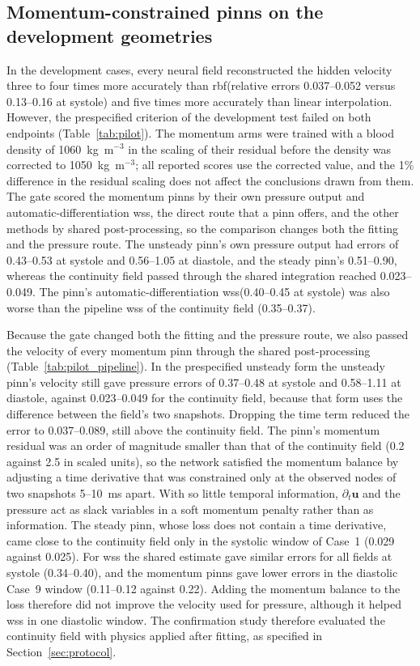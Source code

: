 \documentclass[12pt,a4paper]{article}
\newcommand{\PINN}{\ac{pinn}\xspace}
\newcommand{\PINNs}{\acp{pinn}\xspace}
\newcommand{\WSS}{\ac{wss}\xspace}
\newcommand{\RBF}{\ac{rbf}\xspace}
\theoremstyle{definition}
\numberwithin{equation}{section}
\begin{document}
\subsection{Momentum-constrained \texorpdfstring{\PINNs}{PINNs} on the development geometries}
\label{sec:pilot_results}
In the development cases, every neural field reconstructed the hidden velocity three to four times more accurately than \RBF (relative errors 0.037--0.052 versus 0.13--0.16 at systole) and five times more accurately than linear interpolation. However, the prespecified criterion of the development test failed on both endpoints (Table~\ref{tab:pilot}). The momentum arms were trained with a blood density of 1060~kg~m$^{-3}$ in the scaling of their residual before the density was corrected to 1050~kg~m$^{-3}$; all reported scores use the corrected value, and the 1\% difference in the residual scaling does not affect the conclusions drawn from them. The gate scored the momentum \PINNs by their own pressure output and automatic-differentiation \WSS, the direct route that a \PINN offers, and the other methods by shared post-processing, so the comparison changes both the fitting and the pressure route. The unsteady \PINN's own pressure output had errors of 0.43--0.53 at systole and 0.56--1.05 at diastole, and the steady \PINN's 0.51--0.90, whereas the continuity field passed through the shared integration reached 0.023--0.049. The \PINN's automatic-differentiation \WSS (0.40--0.45 at systole) was also worse than the pipeline \WSS of the continuity field (0.35--0.37).

Because the gate changed both the fitting and the pressure route, we also passed the velocity of every momentum \PINN through the shared post-processing (Table~\ref{tab:pilot_pipeline}). In the prespecified unsteady form the unsteady \PINN's velocity still gave pressure errors of 0.37--0.48 at systole and 0.58--1.11 at diastole, against 0.023--0.049 for the continuity field, because that form uses the difference between the field's two snapshots. Dropping the time term reduced the error to 0.037--0.089, still above the continuity field. The \PINN's momentum residual was an order of magnitude smaller than that of the continuity field (0.2 against 2.5 in scaled units), so the network satisfied the momentum balance by adjusting a time derivative that was constrained only at the observed nodes of two snapshots 5--10~ms apart. With so little temporal information, $\partial_t\mathbf u$ and the pressure act as slack variables in a soft momentum penalty rather than as information. The steady \PINN, whose loss does not contain a time derivative, came close to the continuity field only in the systolic window of Case~1 (0.029 against 0.025). For \WSS the shared estimate gave similar errors for all fields at systole (0.34--0.40), and the momentum \PINNs gave lower errors in the diastolic Case~9 window (0.11--0.12 against 0.22). Adding the momentum balance to the loss therefore did not improve the velocity used for pressure, although it helped \WSS in one diastolic window. The confirmation study therefore evaluated the continuity field with physics applied after fitting, as specified in Section~\ref{sec:protocol}.
\end{document}
